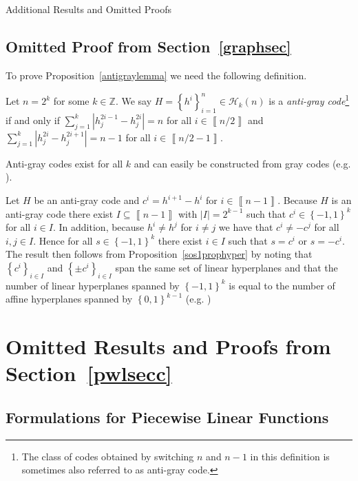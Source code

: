 \documentclass[mnsc]{informs3}
\newcommand{\set}[1]{\left\{#1\right\}}                     %
\newcommand{\abs}[1]{\left|#1\right|}                       %
\newcommand{\sidx}[1]{\left\llbracket     #1 \right\rrbracket}
\newcommand{\Int}{\mathbb Z}
\begin{document}
\begin{APPENDIX}{Additional Results and Omitted Proofs}
\subsection{Omitted Proof from Section~\ref{graphsec}}\label{omproofapendix}




To prove Proposition~\ref{antigraylemma} we need the following definition.

\begin{definition} Let $n=2^k$ for some $k\in \Int$. We say $H=\set{h^i}_{i=1}^{n}\in \mathcal{H}_{k}(n)$ is a \emph{anti-gray code}\footnote{The class of codes obtained by switching $n$ and $n-1$ in this definition is sometimes also referred to as anti-gray code.} if and only if $\sum\nolimits_{j=1}^{k} \abs{h^{2i-1}_j-h^{2i}_j}=n $ for all $i\in \sidx{ n/2}$ and $\sum\nolimits_{j=1}^{k} \abs{h^{2i}_j-h^{2i+1}_j}=n -1 $ for all $i\in \sidx{n/2-1}$.
\end{definition}

Anti-gray codes exist for all $k$ and can easily be constructed from gray codes (e.g. \cite{robinson1981counting}).  

\antigraylemmaLem*
{}
Let $H$ be an anti-gray code and $c^i=h^{i+1}-h^i$ for $i\in \sidx{n-1}$. Because $H$ is an anti-gray code there exist $I\subseteq \sidx{n-1}$ with $\abs{I}=2^{k-1}$ such that $c^i\in \set{-1,1}^k$ for all $i\in I$. In addition, because $h^i\neq h^j$ for $i\neq j$ we have that $c^i\neq -c^j$ for all $i,j \in I$. Hence for all $s\in \set{-1,1}^k$ there exist $i\in I$ such that $s=c^i$ or $s=-c^i$. The result then follows from Proposition~\ref{sos1prophyper} by noting that $\set{c^i}_{i\in I}$ and $\set{\pm c^i}_{i\in I}$ span the same set of linear hyperplanes and that the number of linear hyperplanes spanned by $\set{-1,1}^k$ is equal to the number of affine hyperplanes spanned by $\set{0,1}^{k-1}$ (e.g. \cite{da2005recursivity})
\Halmos\endproof


\section{Omitted Results and Proofs from Section~\ref{pwlsecc}}

\subsection{Formulations for Piecewise Linear Functions}\label{PWLAPPENDIX}


\end{APPENDIX}
\end{document}

